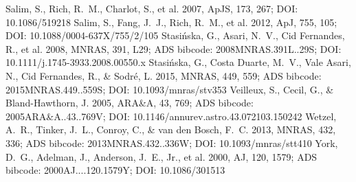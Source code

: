 \documentclass[twocolumn]{aastex631}
\begin{document}
\begin{thebibliography}{}
 Salim, S., Rich, R.~M., Charlot, S., et al. 2007, ApJS, 173, 267; DOI: 10.1086/519218
 Salim, S., Fang, J.~J., Rich, R.~M., et al. 2012, ApJ, 755, 105; DOI: 10.1088/0004-637X/755/2/105
 Stasi{\'n}ska, G., Asari, N.~V., Cid Fernandes, R., et al. 2008, MNRAS, 391, L29; ADS bibcode: 2008MNRAS.391L..29S; DOI: 10.1111/j.1745-3933.2008.00550.x
 Stasi{\'n}ska, G., Costa Duarte, M.~V., Vale Asari, N., Cid Fernandes, R., \& Sodr{\'e}, L. 2015, MNRAS, 449, 559; ADS bibcode: 2015MNRAS.449..559S; DOI: 10.1093/mnras/stv353
 Veilleux, S., Cecil, G., \& Bland-Hawthorn, J. 2005, ARA\&A, 43, 769; ADS bibcode: 2005ARA\&A..43..769V; DOI: 10.1146/annurev.astro.43.072103.150242
 Wetzel, A.~R., Tinker, J.~L., Conroy, C., \& van den Bosch, F.~C. 2013, MNRAS, 432, 336; ADS bibcode: 2013MNRAS.432..336W; DOI: 10.1093/mnras/stt410
 York, D.~G., Adelman, J., Anderson, J.~E., Jr., et al. 2000, AJ, 120, 1579; ADS bibcode: 2000AJ....120.1579Y; DOI: 10.1086/301513
\end{thebibliography}
\end{document}

